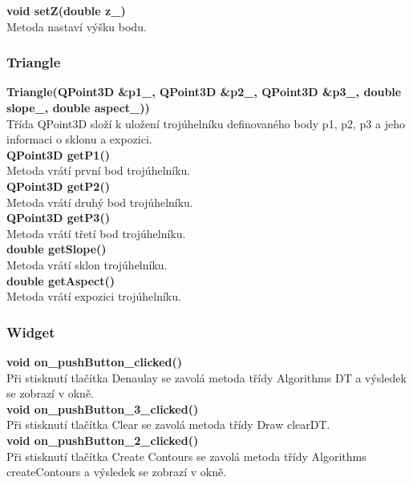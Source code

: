 \documentclass[a4paper, 12pt]{article}
\begin{document}
\textbf{void setZ(double z\_)}\\
Metoda nastaví výšku bodu.\\

\subsubsection{Triangle}
\textbf{Triangle(QPoint3D \&p1\_, QPoint3D \&p2\_, QPoint3D \&p3\_, double slope\_, double aspect\_))}\\
Třída QPoint3D složí k uložení trojúhelníku definovaného body p1, p2, p3 a jeho informaci o sklonu a expozici.\\

\textbf{ QPoint3D getP1()}\\
Metoda vrátí první bod trojúhelníku.\\

\textbf{ QPoint3D getP2()}\\
Metoda vrátí druhý bod trojúhelníku.\\

\textbf{ QPoint3D getP3()}\\
Metoda vrátí třetí bod trojúhelníku.\\

\textbf{double getSlope()}\\
Metoda vrátí sklon trojúhelníku.\\

\textbf{double getAspect()}\\
Metoda vrátí expozici trojúhelníku.\\

\subsubsection{Widget}

\textbf{void on\_pushButton\_clicked()}\\
Při stisknutí tlačítka Denaulay se zavolá metoda třídy Algorithms DT a výsledek se zobrazí v okně.
\\

\textbf{void on\_pushButton\_3\_clicked()}\\
Při stisknutí tlačítka Clear se zavolá metoda třídy Draw clearDT.
\\

\textbf{void on\_pushButton\_2\_clicked()}\\
Při stisknutí tlačítka Create Contours se zavolá metoda třídy Algorithms createContours a výsledek se zobrazí v okně.
\\
\end{document}
